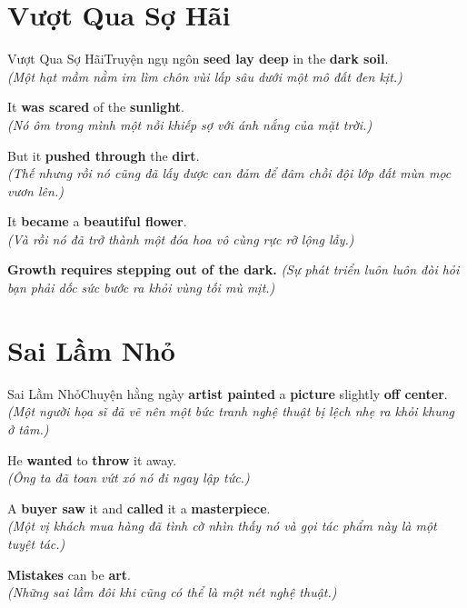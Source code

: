 \section{Vượt Qua Sợ Hãi}
\begin{truyen}{Vượt Qua Sợ Hãi}{Truyện ngụ ngôn}
 \textbf{seed lay deep} in the \textbf{dark soil}.\\
\textit{(Một hạt mầm nằm im lìm chôn vùi lấp sâu dưới một mô đất đen kịt.)}

It \textbf{was scared} of the \textbf{sunlight}.\\
\textit{(Nó ôm trong mình một nỗi khiếp sợ với ánh nắng của mặt trời.)}

But it \textbf{pushed through} the \textbf{dirt}.\\
\textit{(Thế nhưng rồi nó cũng đã lấy được can đảm để đâm chồi đội lớp đất mùn mọc vươn lên.)}

It \textbf{became} a \textbf{beautiful flower}.\\
\textit{(Và rồi nó đã trở thành một đóa hoa vô cùng rực rỡ lộng lẫy.)}
\end{truyen}

\begin{baihoc}
  \textbf{Growth requires stepping out of the dark.} \textit{(Sự phát triển luôn luôn đòi hỏi bạn phải dốc sức bước ra khỏi vùng tối mù mịt.)}
\end{baihoc}

\vspace{0.8cm}

\ngayDay{}
\section{Sai Lầm Nhỏ}
\begin{truyen}{Sai Lầm Nhỏ}{Chuyện hằng ngày}
 \textbf{artist painted} a \textbf{picture} slightly \textbf{off center}.\\
\textit{(Một người họa sĩ đã vẽ nên một bức tranh nghệ thuật bị lệch nhẹ ra khỏi khung ở tâm.)}

He \textbf{wanted} to \textbf{throw} it away.\\
\textit{(Ông ta đã toan vứt xó nó đi ngay lập tức.)}

A \textbf{buyer saw} it and \textbf{called} it a \textbf{masterpiece}.\\
\textit{(Một vị khách mua hàng đã tình cờ nhìn thấy nó và gọi tác phẩm này là một tuyệt tác.)}

\textbf{Mistakes} can be \textbf{art}.\\
\textit{(Những sai lầm đôi khi cũng có thể là một nét nghệ thuật.)}
\end{truyen}

